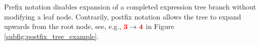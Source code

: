 \documentclass[runningheads]{llncs}
\begin{document}
\par Prefix notation disables expansion of a completed expression tree branch without modifying a leaf node. Contrarily, postfix notation allows the tree to expand upwards from the root node, see, e.g., $\textbf{\textcolor{red}{3}} \rightarrow \textbf{\textcolor{red}{4}} $ in Figure \ref{subfig:postfix_tree_example}.

\end{document}
